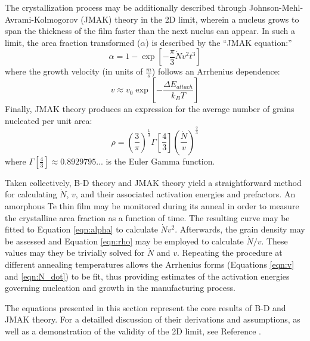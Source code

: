The crystallization process may be additionally described through Johnson-Mehl-Avrami-Kolmogorov (JMAK) theory in the 2D limit, wherein a nucleus grows to span the thickness of the film faster than the next nuclus can appear.  In such a limit, the area fraction transformed ($\alpha$) is described by the ``JMAK equation:''
%
	\begin{equation}
		\alpha = 1 - \exp
		\left[ -\frac{\pi}{3}\dot{N}v^2t^3 \right]
	\label{eqn:alpha}
	\end{equation}
%
where the growth velocity (in units of $\frac{m}{s}$) follows an Arrhenius dependence:
%
	\begin{equation}
		v \approx v_0 \exp \left[ - \frac{\Delta E_{attach}}{k_B T} \right]
	\label{eqn:v}
	\end{equation}
%
Finally, JMAK theory produces an expression for the average number of grains nucleated per unit area:
%
	\begin{equation}
		\rho = \left(\frac{3}{\pi}\right)^{\frac{1}{3}}
		\Gamma \left[ \frac{4}{3} \right]
		\left( \frac{\dot{N}}{v} \right)^{\frac{2}{3}}
	\label{eqn:rho}
	\end{equation}
%
where $\Gamma \left[ \frac{4}{3} \right] \approx 0.8929795...$ is the Euler Gamma function.

Taken collectively, B-D theory and JMAK theory yield a straightforward method for calculating $\dot{N}$, $v$, and their associated activation energies and prefactors.  An amorphous Te thin film may be monitored during its anneal in order to measure the crystalline area fraction as a function of time.  The resulting curve may be fitted to Equation \ref{eqn:alpha} to calculate $\dot{N}v^2$.  Afterwards, the grain density may be assessed and Equation \ref{eqn:rho} may be employed to calculate $\dot{N}/v$.  These values may they be trivially solved for $\dot{N}$ and ${v}$.  Repeating the procedure at different annealing temperatures allows the Arrhenius forms (Equations \ref{eqn:v} and \ref{eqn:N_dot}) to be fit, thus providing estimates of the activation energies governing nucleation and growth in the manufacturing process.

The equations presented in this section represent the core results of B-D and JMAK theory.  For a detailled discussion of their derivations and assumptions, as well as a demonstration of the validity of the 2D limit, see Reference \cite{chrzan:2020}.
